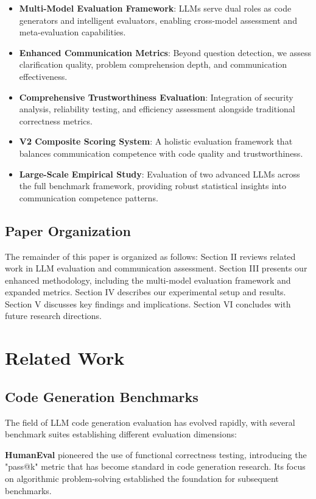 \documentclass[conference]{IEEEtran}
\begin{document}
\begin{itemize}
    \item \textbf{Multi-Model Evaluation Framework}: LLMs serve dual roles as code generators and intelligent evaluators, enabling cross-model assessment and meta-evaluation capabilities.
    \item \textbf{Enhanced Communication Metrics}: Beyond question detection, we assess clarification quality, problem comprehension depth, and communication effectiveness.
    \item \textbf{Comprehensive Trustworthiness Evaluation}: Integration of security analysis, reliability testing, and efficiency assessment alongside traditional correctness metrics.
    \item \textbf{V2 Composite Scoring System}: A holistic evaluation framework that balances communication competence with code quality and trustworthiness.
    \item \textbf{Large-Scale Empirical Study}: Evaluation of two advanced LLMs across the full benchmark framework, providing robust statistical insights into communication competence patterns.
\end{itemize}

\subsection{Paper Organization}

The remainder of this paper is organized as follows: Section II reviews related work in LLM evaluation and communication assessment. Section III presents our enhanced methodology, including the multi-model evaluation framework and expanded metrics. Section IV describes our experimental setup and results. Section V discusses key findings and implications. Section VI concludes with future research directions.

\section{Related Work}

\subsection{Code Generation Benchmarks}

The field of LLM code generation evaluation has evolved rapidly, with several benchmark suites establishing different evaluation dimensions:

\textbf{HumanEval} \cite{chen2021evaluating} pioneered the use of functional correctness testing, introducing the "pass@k" metric that has become standard in code generation research. Its focus on algorithmic problem-solving established the foundation for subsequent benchmarks.
\end{document}

